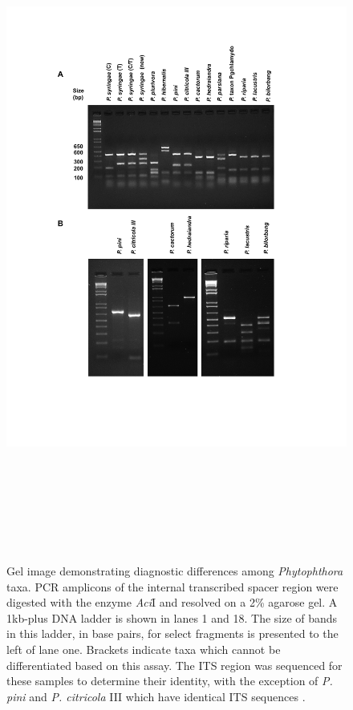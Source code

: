 \documentclass[12pt]{article}
\begin{document}
\begin{figure}[!ht]
\begin{center}
\includegraphics[width=178mm, height=220mm]{Restriction_figure_v2.pdf}
\end{center}
\caption{
Gel image demonstrating diagnostic differences among \emph{Phytophthora} taxa. PCR amplicons of the internal transcribed spacer region were digested with the enzyme \emph{Aci}I and resolved on a 2\% agarose gel.  A 1kb-plus DNA ladder is shown in lanes 1 and 18.  The size of bands in this ladder, in base pairs, for select fragments is presented to the left of lane one.  Brackets indicate taxa which cannot be differentiated based on this assay.  The ITS region was sequenced for these samples to determine their identity, with the exception of \emph{P. pini} and \emph{P. citricola} III which have identical ITS sequences \cite{hong2011}.
}
\label{fig:gel}
\end{figure}
\clearpage
\end{document}
